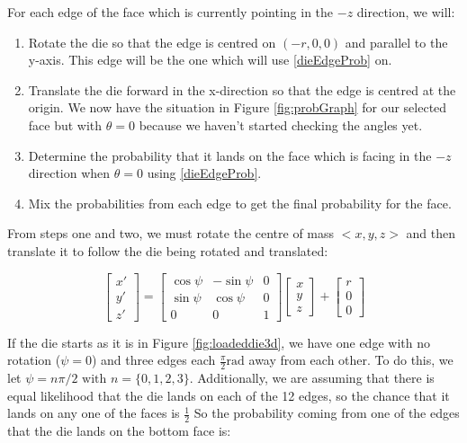 \documentclass[english,12pt,a4paper,final]{article}
\begin{document}
For each edge of the face which is currently pointing in the $-z$ direction, we will:

\begin{enumerate}
	\item Rotate the die so that the edge is centred on $(-r, 0, 0)$ and parallel to the y-axis. This edge will be the one which will use \eqref{dieEdgeProb} on.
	\item Translate the die forward in the x-direction so that the edge is centred at the origin. We now have the situation in Figure \ref{fig:probGraph} for our selected face but with $\theta=0$ because we haven't started checking the angles yet.
	\item Determine the probability that it lands on the face which is facing in the $-z$ direction when $\theta=0$ using \eqref{dieEdgeProb}.
	\item Mix the probabilities from each edge to get the final probability for the face.
\end{enumerate}

From steps one and two, we must rotate the centre of mass $<x, y, z>$ and then translate it to follow the die being rotated and translated:

\begin{equation*}
	\begin{bmatrix}x'\\y'\\z'\end{bmatrix} = \begin{bmatrix}\cos\psi & -\sin\psi & 0 \\ \sin\psi & \cos\psi & 0 \\ 0 & 0 & 1\end{bmatrix} \begin{bmatrix}x\\y\\z\end{bmatrix} + \begin{bmatrix}r\\0\\0\end{bmatrix}
\end{equation*}

If the die starts as it is in Figure \ref{fig:loadeddie3d}, we have one edge with no rotation ($\psi=0$) and three edges each $\frac{\pi}{2} \text{rad}$ away from each other. To do this, we let $\psi = n\pi/2 \text{ with } n=\{0, 1, 2, 3\}$. Additionally, we are assuming that there is equal likelihood that the die lands on each of the 12 edges, so the chance that it lands on any one of the faces is $\frac{1}{2}$ So the probability coming from one of the edges that the die lands on the bottom face is:
\end{document}
